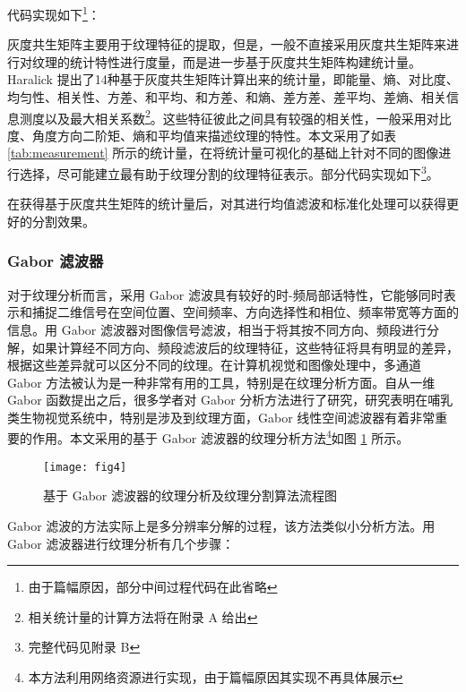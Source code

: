 代码实现如下\footnote{由于篇幅原因，部分中间过程代码在此省略}：
\vspace{0.3cm}


灰度共生矩阵主要用于纹理特征的提取，但是，一般不直接采用灰度共生矩阵来进行对纹理的统计特性进行度量，而是进一步基于灰度共生矩阵构建统计量。Haralick 提出了14种基于灰度共生矩阵计算出来的统计量，即能量、熵、对比度、均匀性、相关性、方差、和平均、和方差、和熵、差方差、差平均、差熵、相关信息测度以及最大相关系数\footnote{相关统计量的计算方法将在附录 A 给出}。这些特征彼此之间具有较强的相关性，一般采用对比度、角度方向二阶矩、熵和平均值来描述纹理的特性。本文采用了如表 \ref{tab:measurement} 所示的统计量，在将统计量可视化的基础上针对不同的图像进行选择，尽可能建立最有助于纹理分割的纹理特征表示。部分代码实现如下\footnote{完整代码见附录 B}。

在获得基于灰度共生矩阵的统计量后，对其进行均值滤波和标准化处理可以获得更好的分割效果。

\vspace{0.3cm}


\subsubsection{Gabor 滤波器}

对于纹理分析而言，采用 Gabor 滤波具有较好的时-频局部话特性，它能够同时表示和捕捉二维信号在空间位置、空间频率、方向选择性和相位、频率带宽等方面的信息。用 Gabor 滤波器对图像信号滤波，相当于将其按不同方向、频段进行分解，如果计算经不同方向、频段滤波后的纹理特征，这些特征将具有明显的差异，根据这些差异就可以区分不同的纹理。在计算机视觉和图像处理中，多通道 Gabor 方法被认为是一种非常有用的工具，特别是在纹理分析方面。自从一维 Gabor 函数提出之后，很多学者对 Gabor 分析方法进行了研究，研究表明在哺乳类生物视觉系统中，特别是涉及到纹理方面，Gabor 线性空间滤波器有着非常重要的作用。本文采用的基于 Gabor 滤波器的纹理分析方法\footnote{本方法利用网络资源进行实现，由于篇幅原因其实现不再具体展示}如图 \ref{fig:gabor} 所示。

\begin{figure}[!htbp]
	\centering
	\texttt{[image: fig4]}
	\caption{基于 Gabor 滤波器的纹理分析及纹理分割算法流程图}
	\label{fig:gabor}
\end{figure}

Gabor 滤波的方法实际上是多分辨率分解的过程，该方法类似小分析方法。用 Gabor 滤波器进行纹理分析有几个步骤：

